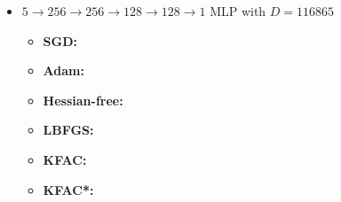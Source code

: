 \begin{itemize}
\item $5 \to 256 \to 256\to 128 \to 128 \to 1$ MLP with $D=\num{116865}$
  \begin{itemize}
    \def\pathToRuns{../kfac_pinns_exp/exp19_poisson5d_mlp_tanh_256/tex}
  \item \textbf{SGD:} 
  \item \textbf{Adam:} 
  \item \textbf{Hessian-free:} 
  \item \textbf{LBFGS:} 
  \item \textbf{KFAC:} 
  \item \textbf{KFAC*:} 
  \end{itemize}
\end{itemize}

